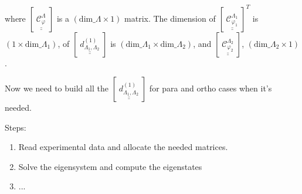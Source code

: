 \documentclass[english,twoside, openright]{report}
\newcommand{\coefm}[1]{
  \mathcal{C}^{\Lambda_{#1}}_{\varphi_{#1}}
}
\newcommand{\ppmat}[1]{
  \left[\;
    \underline{\underline{
        #1
      }}
  \;\right]
}
\begin{document}
where $\ppmat{\coefm{}}$ is a
$\left(\text{dim\_}\Lambda\times 1\right)$ matrix. The dimension of
$\ppmat{\coefm{1}}^{T}$ is
$\left(1\times\text{dim\_}\Lambda_1\right)$, of
$\ppmat{d^{(1)}_{\Lambda_1,\Lambda_2}}$ is
$\left(\text{dim\_}\Lambda_1\times\text{dim\_}\Lambda_2\right)$, and
$\ppmat{\coefm{2}}$, $\left(\text{dim\_}\Lambda_2\times 1\right)$.

Now we need to build all the $\ppmat{d^{(1)}_{\Lambda_1,\Lambda_2}}$
for para and ortho cases when it's needed.

Steps:
\begin{enumerate}
\item Read experimental data and allocate the needed matrices.
\item Solve the eigensystem and compute the eigenstates
\item ... 
\end{enumerate}
\end{document}
